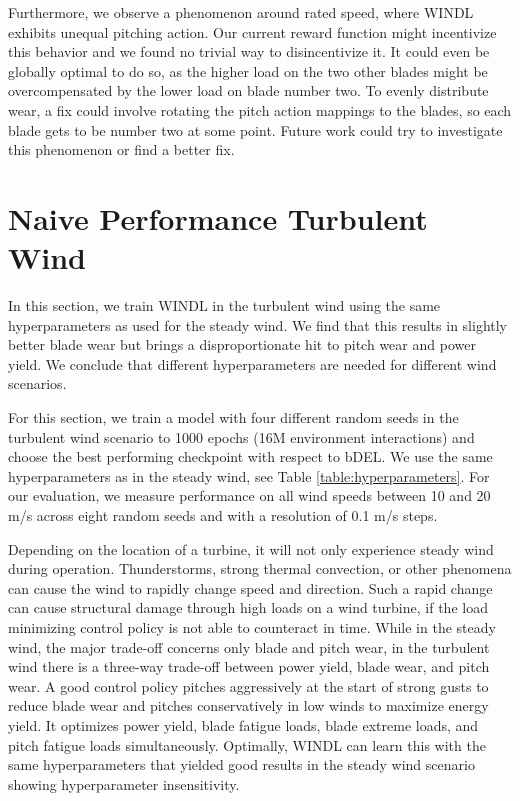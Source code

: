 Furthermore, we observe a phenomenon around rated speed, where WINDL exhibits unequal pitching action. Our current reward function might incentivize this behavior and we found no trivial way to disincentivize it. It could even be globally optimal to do so, as the higher load on the two other blades might be overcompensated by the lower load on blade number two. To evenly distribute wear, a fix could involve rotating the pitch action mappings to the blades, so each blade gets to be number two at some point. Future work could try to investigate this phenomenon or find a better fix.

\section{Naive Performance Turbulent Wind}
\label{section:results-naive-turbulent}

\begin{summary}
In this section, we train WINDL in the turbulent wind using the same hyperparameters as used for the steady wind. We find that this results in slightly better blade wear but brings a disproportionate hit to pitch wear and power yield. We conclude that different hyperparameters are needed for different wind scenarios.
\end{summary}

For this section, we train a model with four different random seeds in the turbulent wind scenario to 1000 epochs (16M environment interactions) and choose the best performing checkpoint with respect to bDEL. We use the same hyperparameters as in the steady wind, see Table \ref{table:hyperparameters}. For our evaluation, we measure performance on all wind speeds between 10 and 20 m/s across eight random seeds and with a resolution of 0.1 m/s steps.

Depending on the location of a turbine, it will not only experience steady wind during operation. Thunderstorms, strong thermal convection, or other phenomena can cause the wind to rapidly change speed and direction. Such a rapid change can cause structural damage through high loads on a wind turbine, if the load minimizing control policy is not able to counteract in time. While in the steady wind, the major trade-off concerns only blade and pitch wear, in the turbulent wind there is a three-way trade-off between power yield, blade wear, and pitch wear. A good control policy pitches aggressively at the start of strong gusts to reduce blade wear and pitches conservatively in low winds to maximize energy yield. It optimizes power yield, blade fatigue loads, blade extreme loads, and pitch fatigue loads simultaneously. Optimally, WINDL can learn this with the same hyperparameters that yielded good results in the steady wind scenario showing hyperparameter insensitivity.

